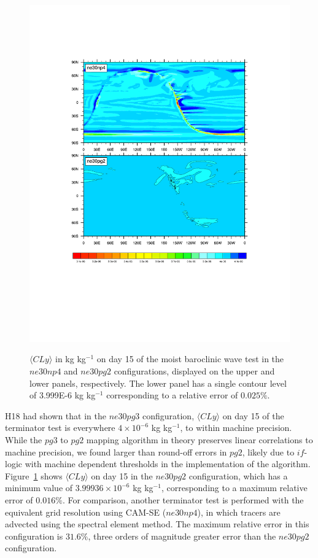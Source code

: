 \documentclass{agujournal}
\begin{document}
\begin{figure}[t]
\begin{center}
\noindent\includegraphics[width=30pc,angle=0]{figs/temp_terminator.pdf}\\
\end{center}
\caption{$\langle CLy \rangle$ in kg kg$^{-1}$ on day 15 of the moist baroclinic wave test in the $ne30np4$ and $ne30pg2$ configurations, displayed on the upper and lower panels, respectively. The lower panel has a single contour level of 3.999E-6 kg kg$^{-1}$ corresponding to a relative error of $0.025\%$.}
\label{fig:terminator}
\end{figure}

H18 had shown that in the $ne30pg3$ configuration, $\langle CLy \rangle$ on day 15 of the terminator test is everywhere $4\times10^{-6}$ kg kg$^{-1}$, to within machine precision. While the $pg3$ to $pg2$ mapping algorithm in theory preserves linear correlations to machine precision, we found larger than round-off errors in $pg2$, likely due to $if$-logic with machine dependent thresholds in the implementation of the algorithm. Figure~\ref{fig:terminator} shows $\langle CLy \rangle$ on day 15 in the $ne30pg2$ configuration, which has a minimum value of $3.99936\times10^{-6}$ kg kg$^{-1}$, corresponding to a maximum relative error of $0.016\%$. For comparison, another terminator test is performed with the equivalent grid resolution using CAM-SE ($ne30np4$), in which tracers are advected using the spectral element method. The maximum relative error in this configuration is $31.6\%$, three orders of magnitude greater error than the $ne30pg2$ configuration.
\end{document}

